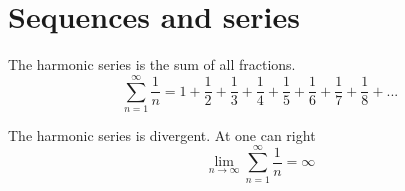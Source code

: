 \chapter{Sequences and series}

\begin{definition}
    The harmonic series is the sum of all fractions.
    \begin{equation}
        \sum_{n=1}^{\infty}\frac{1}{n} = 
            1 + 
            \frac{1}{2} + 
            \frac{1}{3} + \frac{1}{4} + 
            \frac{1}{5} + \frac{1}{6} + \frac{1}{7} + \frac{1}{8} + ...
    \end{equation}
\end{definition}

\begin{theorem}
    The harmonic series is divergent. At one can right
    \begin{equation}
        \lim_{n\to\infty}\sum_{n=1}^{\infty}\frac{1}{n} = \infty
    \end{equation}
\end{theorem}
